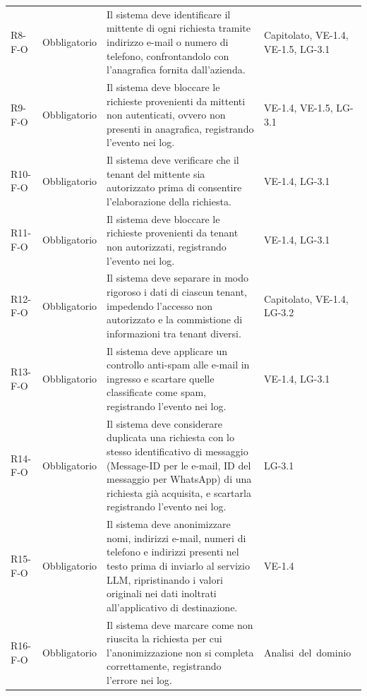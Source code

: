 {\begin{longtable}{|>{\raggedright\arraybackslash}p{1.8cm}|>{\raggedright\arraybackslash}p{2.3cm}|>{\raggedright\arraybackslash}p{6.6cm}|>{\raggedright\arraybackslash}p{3.1cm}|}
    \multicolumn{4}{|l|}{\cellcolor[gray]{0.94}\textbf{Macroarea 2 --- Filtro di sicurezza in ingresso}} \\ \hline
    \mbox{R8-F-O} & Obbligatorio & Il sistema deve identificare il mittente di ogni richiesta tramite indirizzo e-mail o numero di telefono, confrontandolo con l'anagrafica fornita dall'azienda. & \mbox{Capitolato}, \mbox{VE-1.4}, \mbox{VE-1.5}, \mbox{LG-3.1} \\ \hline
    \mbox{R9-F-O} & Obbligatorio & Il sistema deve bloccare le richieste provenienti da mittenti non autenticati, ovvero non presenti in anagrafica, registrando l'evento nei log. & \mbox{VE-1.4}, \mbox{VE-1.5}, \mbox{LG-3.1} \\ \hline
    \mbox{R10-F-O} & Obbligatorio & Il sistema deve verificare che il tenant del mittente sia autorizzato prima di consentire l'elaborazione della richiesta. & \mbox{VE-1.4}, \mbox{LG-3.1} \\ \hline
    \mbox{R11-F-O} & Obbligatorio & Il sistema deve bloccare le richieste provenienti da tenant non autorizzati, registrando l'evento nei log. & \mbox{VE-1.4}, \mbox{LG-3.1} \\ \hline
    \mbox{R12-F-O} & Obbligatorio & Il sistema deve separare in modo rigoroso i dati di ciascun tenant, impedendo l'accesso non autorizzato e la commistione di informazioni tra tenant diversi. & \mbox{Capitolato}, \mbox{VE-1.4}, \mbox{LG-3.2} \\ \hline
    \mbox{R13-F-O} & Obbligatorio & Il sistema deve applicare un controllo anti-spam alle e-mail in ingresso e scartare quelle classificate come spam, registrando l'evento nei log. & \mbox{VE-1.4}, \mbox{LG-3.1} \\ \hline
    \mbox{R14-F-O} & Obbligatorio & Il sistema deve considerare duplicata una richiesta con lo stesso identificativo di messaggio (Message-ID per le e-mail, ID del messaggio per WhatsApp) di una richiesta già acquisita, e scartarla registrando l'evento nei log. & \mbox{LG-3.1} \\ \hline
    \mbox{R15-F-O} & Obbligatorio & Il sistema deve anonimizzare nomi, indirizzi e-mail, numeri di telefono e indirizzi presenti nel testo prima di inviarlo al servizio LLM, ripristinando i valori originali nei dati inoltrati all'applicativo di destinazione. & \mbox{VE-1.4} \\ \hline
    \mbox{R16-F-O} & Obbligatorio & Il sistema deve marcare come non riuscita la richiesta per cui l'anonimizzazione non si completa correttamente, registrando l'errore nei log. & \mbox{Analisi del dominio} \\ \hline

\end{longtable}}
